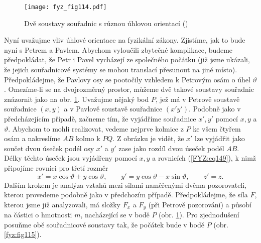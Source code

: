     \begin{figure}[ht!]  %
      \centering
      \texttt{[image: fyz\_fig114.pdf]}
      \caption{Dvě soustavy souřadnic s různou úhlovou orientací
              (\cite[s.~156]{Feynman01})}
      \label{fyz:fig114}
    \end{figure}
    Nyní uvažujme vliv úhlové orientace na fyzikální zákony. Zjistíme, jak to bude nyní s Petrem a 
    Pavlem. Abychom vyloučili zbytečné komplikace, budeme předpokládat, že Petr i Pavel vycházejí 
    ze společného počátku (již jsme ukázali, že jejich souřadnicové systémy se mohou translací 
    přesunout na jiné místo). Předpokládejme, že Pavlovy osy se pootočily vzhledem k Petrovým osám 
    o úhel \(\vartheta\). Omezíme-li se na dvojrozměrný prostor, můžeme dvě takové soustavy 
    souřadnic znázornit jako na obr. \ref{fyz:fig114}. Uvažujme nějaký bod \(P\), jež má v Petrově 
    soustavě souřadnice \((x, y)\) a v Pavlově soustavě souřadnice \((x' y')\). Podobně jako v 
    předcházejícím případě, začneme tím, že vyjádříme souřadnice \(x', y'\) pomocí \(x, y\) a 
    \(\vartheta\). Abychom to mohli realizovat, vedeme nejprve kolmice z \(P\) ke všem čtyřem osám 
    a nakreslíme \(AB\) kolmo k \(PQ\). Z obrázku je vidět, že \(x'\) lze vyjádřit jako součet dvou 
    úseček podél osy \(x'\) a \(y'\) zase jako rozdíl dvou úseček podél \(AB\). Délky těchto úseček 
    jsou vyjádřeny pomocí \(x, y\) a rovnicích (\ref{FYZ:eq149}), k nimž připojíme rovnici pro 
    třetí rozměr
    \begin{equation}\label{FYZ:eq149}
      x' = x\cos\vartheta + y\cos\vartheta, \qquad
      y' = y\cos\vartheta - x\sin\vartheta, \qquad
      z' = z.
    \end{equation}
    Dalším krokem je analýza vztahů mezi silami naměřenými dvěma pozorovateli, kterou provedeme 
    podobně jako v předchozím případě. Předpokládejme, že síla \(F\), kterou jsme již analyzovali, 
    má složky \(F_x\) a \(F_y\) (při Petrově pozorování) a působí na částici o hmotnosti \(m\), 
    nacházející se v bodě \(P\) (obr. \ref{fyz:fig114}). Pro zjednodušení posuňme obě souřadnicové 
    soustavy tak, že počátek bude v bodě \(P\) (obr. \ref{fyz:fig115}).
    

